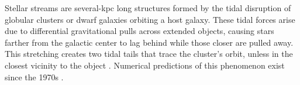\documentclass[draft]{aa}
\begin{document}

    

  Stellar streams are several-kpc long structures formed by the tidal disruption of globular clusters or dwarf galaxies orbiting a host galaxy. These tidal forces arise due to differential gravitational pulls across extended objects, causing stars farther from the galactic center to lag behind while those closer are pulled away. This stretching creates two tidal tails that trace the cluster's orbit, unless in the closest vicinity to the object \citep{2007ApJ...659.1212M}. Numerical predictions of this phenomenon exist since the 1970s \citep[see, for example][]{1975AJ.....80..290K}. 
  
\end{document}
